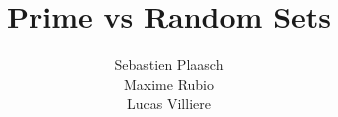\documentclass{article}
\begin{document}
\author{Sebastien Plaasch \\ Maxime Rubio  \\ Lucas Villiere}
\title{Prime vs Random Sets}
\maketitle

\tableofcontents
\end{document}
